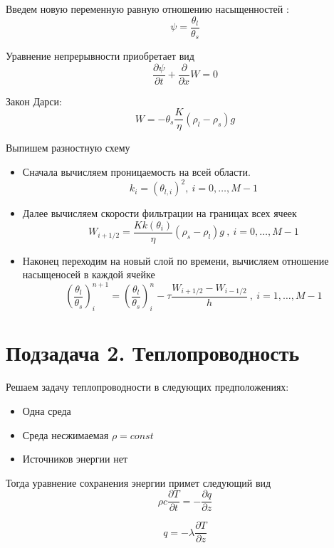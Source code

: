 \documentclass[12pt]{article}
\newcommand{\pd}[2]{\frac{\partial #1}{\partial #2}}
\begin{document}
Введем новую переменную равную отношению насыщенностей : 
$$
\psi = \frac{\theta_l}{\theta_s} 
$$

Уравнение непрерывности приобретает вид
$$
\pd{\psi}{t} + \pd{}{x}W = 0
$$

Закон Дарси:
$$
W= -\theta_s \frac{K}{\eta}(\rho_l-\rho_s)g
$$

Выпишем разностную схему
\begin{itemize}
\item Сначала вычисляем проницаемость на всей области.
\begin{equation}
k_i = (\theta_{l,i})^2 , \ i = 0,  \dots ,M-1
\label{perm_razn}
\end{equation}

\item Далее вычисляем скорости фильтрации на границах всех ячеек
\begin{equation}
W_{i+1/2} = \frac{K k(\theta_i)}{\eta}(\rho_s-\rho_l)g \ , \ i = 0,  \dots ,M-1
\label{Darsi_razn}
\end{equation}

\item Наконец переходим на новый слой по времени, вычисляем отношение насыщеносей в каждой ячейке
\begin{equation}
\left(\frac{\theta_l}{\theta_s}\right)_i^{n+1} = \left(\frac{\theta_l}{\theta_s}\right)_i^n - \tau\frac{W_{i+1/2} - W_{i-1/2}}{h} \ , \ i = 1,  \dots ,M-1
\label{filtr_razn}
\end{equation}
\end{itemize}
\newpage
\section*{Подзадача 2. Теплопроводность}
Решаем задачу теплопроводности в следующих предположениях:
\begin{itemize}
\item Одна среда
\item Среда несжимаемая $\rho = const$
\item Источников энергии нет
\end{itemize}

Тогда уравнение сохранения энергии примет следующий вид
\begin{equation}
\rho c \pd{T}{t} = - \pd{q}{z}
\label{termal_1}
\end{equation}

\begin{equation}
q = - \lambda\pd{T}{z}
\label{termal_2}
\end{equation}
\end{document}

